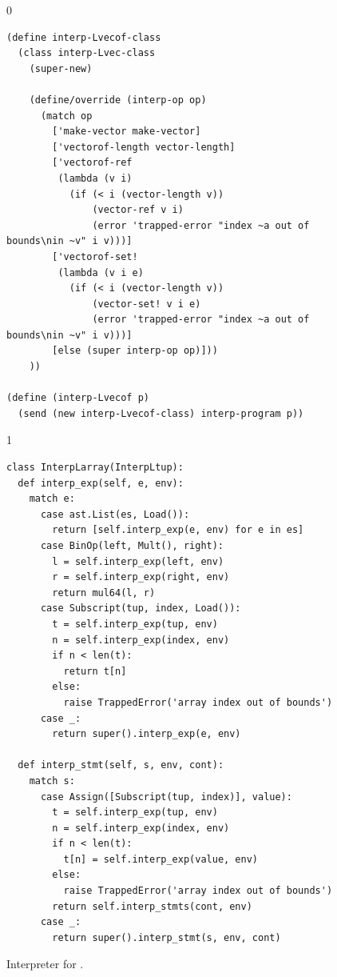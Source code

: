 \documentclass[7x10]{TimesAPriori_MIT}%
\def\racketEd{0}
\def\pythonEd{1}
\providecommand{\BookEdition}{1}
\let\edition\BookEdition
\newcommand{\pythonColor}[0]{}
\numberwithin{theorem}{chapter}
\numberwithin{definition}{chapter}
\numberwithin{equation}{chapter}
\begin{document}
\begin{figure}[tbp]
  \begin{tcolorbox}[colback=white]
{\if\edition\racketEd    
\begin{lstlisting}[basicstyle=\ttfamily\footnotesize]
(define interp-Lvecof-class
  (class interp-Lvec-class
    (super-new)

    (define/override (interp-op op)
      (match op
        ['make-vector make-vector]
        ['vectorof-length vector-length]
        ['vectorof-ref
         (lambda (v i)
           (if (< i (vector-length v))
               (vector-ref v i)
               (error 'trapped-error "index ~a out of bounds\nin ~v" i v)))]
        ['vectorof-set!
         (lambda (v i e)
           (if (< i (vector-length v))
               (vector-set! v i e)
               (error 'trapped-error "index ~a out of bounds\nin ~v" i v)))]
        [else (super interp-op op)]))
    ))

(define (interp-Lvecof p)
  (send (new interp-Lvecof-class) interp-program p))
\end{lstlisting}
    \fi}
{\if\edition\pythonEd\pythonColor
\begin{lstlisting}[basicstyle=\ttfamily\footnotesize]
class InterpLarray(InterpLtup):
  def interp_exp(self, e, env):
    match e:
      case ast.List(es, Load()):
        return [self.interp_exp(e, env) for e in es]
      case BinOp(left, Mult(), right):
        l = self.interp_exp(left, env)
        r = self.interp_exp(right, env)
        return mul64(l, r)
      case Subscript(tup, index, Load()):
        t = self.interp_exp(tup, env)
        n = self.interp_exp(index, env)
        if n < len(t):
          return t[n]
        else:
          raise TrappedError('array index out of bounds')
      case _:
        return super().interp_exp(e, env)

  def interp_stmt(self, s, env, cont):
    match s:
      case Assign([Subscript(tup, index)], value):
        t = self.interp_exp(tup, env)
        n = self.interp_exp(index, env)
        if n < len(t):
          t[n] = self.interp_exp(value, env)
        else:
          raise TrappedError('array index out of bounds')
        return self.interp_stmts(cont, env)
      case _:
        return super().interp_stmt(s, env, cont)
\end{lstlisting}
\fi}
  \end{tcolorbox}

  \caption{Interpreter for \LangArray{}.}
\label{fig:interp-Lvecof}
\end{figure}
\end{document}

